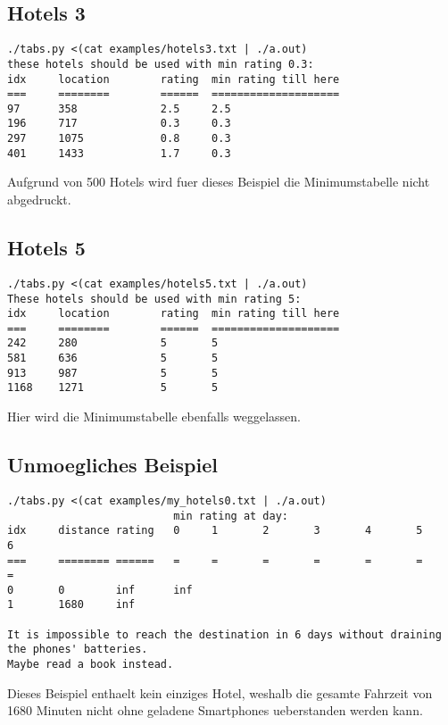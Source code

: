 \documentclass[a4paper,10pt,ngerman]{scrartcl}
\begin{document}
\subsection*{Hotels 3}
\begin{lstlisting}
./tabs.py <(cat examples/hotels3.txt | ./a.out)
these hotels should be used with min rating 0.3:
idx     location        rating  min rating till here
===     ========        ======  ====================
97      358             2.5     2.5
196     717             0.3     0.3
297     1075            0.8     0.3
401     1433            1.7     0.3
\end{lstlisting}
Aufgrund von 500 Hotels wird fuer dieses Beispiel die Minimumstabelle nicht abgedruckt.

\subsection*{Hotels 5}
\begin{lstlisting}
./tabs.py <(cat examples/hotels5.txt | ./a.out)
These hotels should be used with min rating 5:
idx     location        rating  min rating till here
===     ========        ======  ====================
242     280             5       5
581     636             5       5
913     987             5       5
1168    1271            5       5
\end{lstlisting}
Hier wird die Minimumstabelle ebenfalls weggelassen.

\subsection*{Unmoegliches Beispiel}
\begin{lstlisting}
./tabs.py <(cat examples/my_hotels0.txt | ./a.out)
                          min rating at day:
idx     distance rating   0     1       2       3       4       5       6
===     ======== ======   =     =       =       =       =       =       =
0       0        inf      inf
1       1680     inf

It is impossible to reach the destination in 6 days without draining the phones' batteries.
Maybe read a book instead.
\end{lstlisting}
Dieses Beispiel enthaelt kein einziges Hotel, weshalb die gesamte Fahrzeit von 1680 Minuten nicht ohne geladene Smartphones ueberstanden werden kann.
\end{document}
